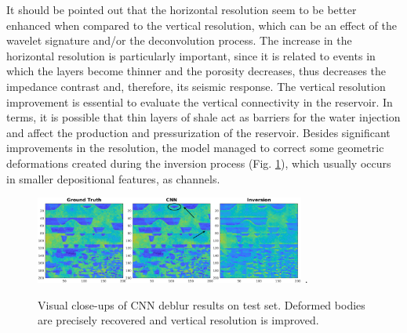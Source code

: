 \documentclass[journal]{IEEEtran}
\begin{document}
It should be pointed out that the horizontal resolution seem to be
better enhanced when compared to the vertical resolution, which can
be an effect of the wavelet signature and/or the deconvolution process.
The increase in the horizontal resolution is particularly important,
since it is related to events in which the layers become thinner and the porosity
decreases, thus decreases the impedance contrast and, therefore, its
seismic response. The vertical resolution improvement is essential to
evaluate the vertical connectivity in the reservoir. In terms, it is possible
that thin layers of shale act as barriers for the water injection and affect the production
and pressurization of the reservoir. Besides significant improvements
in the resolution, the model managed to correct some geometric deformations
created during the inversion process (Fig. \ref{ImSec36}), which usually
occurs in smaller depositional features, as channels.
\begin{figure}[!t]
\centering
\includegraphics[width=3.5in]{Figs/ImSec36}
\DeclareGraphicsExtensions.
\caption{Visual close-ups of CNN deblur results on test set. Deformed bodies
are precisely recovered and vertical resolution is improved.}
\label{ImSec36}
\end{figure}
\end{document}
